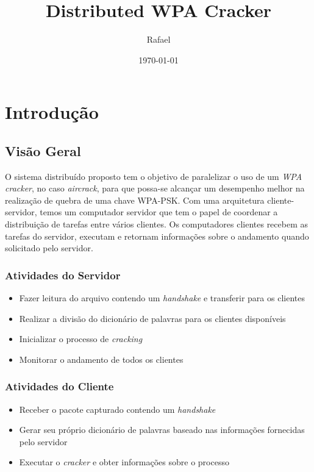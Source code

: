 \documentclass[12pt,a4paper]{abnt}
\begin{document}
\author{Rafael}
\date{\today}
\title{Distributed WPA Cracker}
\maketitle


\tableofcontents
\listoffigures
\clearpage

\chapter{Introdução}
	\section{Visão Geral}
		O sistema distribuído proposto tem o objetivo de paralelizar o uso de um \emph{WPA cracker}, no caso \emph{aircrack}, para que possa-se alcançar um desempenho melhor na realização de quebra de uma chave WPA-PSK. Com uma arquitetura cliente-servidor, 
		temos um computador servidor que tem o papel de coordenar a distribuição de tarefas entre vários clientes. Os computadores clientes recebem as tarefas do servidor, executam e retornam informações sobre o andamento quando solicitado pelo servidor.
		
		\subsection{Atividades do Servidor}
		\begin{itemize}
			\item Fazer leitura do arquivo contendo um \emph{handshake} e transferir para os clientes 
			\item Realizar a divisão do dicionário de palavras para os clientes disponíveis
			\item Inicializar o processo de \emph{cracking}
			\item Monitorar o andamento de todos os clientes
		\end{itemize}
		
		\subsection{Atividades do Cliente}
		\begin{itemize}
			\item Receber o pacote capturado contendo um \emph{handshake}
			\item Gerar seu próprio dicionário de palavras baseado nas informações fornecidas pelo servidor
			\item Executar o \emph{cracker} e obter informações sobre o processo
		\end{itemize}
\end{document}
